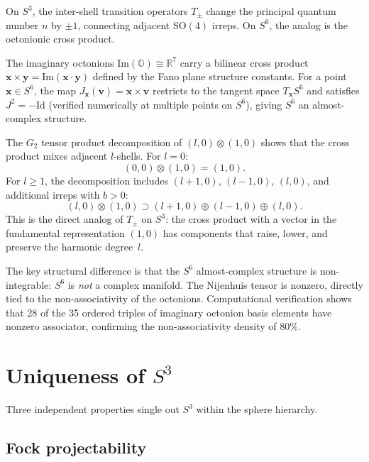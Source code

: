 \documentclass[twocolumn,pra,amsmath,amssymb,superscriptaddress]{revtex4-2}
\begin{document}
On $S^3$, the inter-shell transition operators $T_{\pm}$ change the
principal quantum number $n$ by $\pm 1$, connecting adjacent
$\mathrm{SO}(4)$ irreps.  On $S^6$, the analog is the octonionic
cross product.

The imaginary octonions $\mathrm{Im}(\mathbb{O}) \cong \mathbb{R}^7$
carry a bilinear cross product $\mathbf{x} \times \mathbf{y} =
\mathrm{Im}(\mathbf{x} \cdot \mathbf{y})$ defined by the Fano plane
structure constants.  For a point $\mathbf{x} \in S^6$, the map
$J_{\mathbf{x}}(\mathbf{v}) = \mathbf{x} \times \mathbf{v}$
restricts to the tangent space $T_{\mathbf{x}} S^6$ and satisfies
$J^2 = -\mathrm{Id}$ (verified numerically at multiple points on
$S^6$), giving $S^6$ an almost-complex structure.

The $G_2$ tensor product decomposition of $(l,0) \otimes (1,0)$
shows that the cross product mixes adjacent $l$-shells.  For
$l = 0$:
\begin{equation}
(0,0) \otimes (1,0) = (1,0).
\end{equation}
For $l \geq 1$, the decomposition includes $(l+1,0)$, $(l-1,0)$,
$(l,0)$, and additional irreps with $b > 0$:
\begin{equation}
(l,0) \otimes (1,0) \supset (l{+}1,0) \oplus (l{-}1,0) \oplus (l,0).
\end{equation}
This is the direct analog of $T_{\pm}$ on $S^3$: the cross product
with a vector in the fundamental representation $(1,0)$ has
components that raise, lower, and preserve the harmonic degree~$l$.

The key structural difference is that the $S^6$ almost-complex
structure is non-integrable: $S^6$ is \emph{not} a complex manifold.
The Nijenhuis tensor is nonzero, directly tied to the
non-associativity of the octonions.  Computational verification
shows that 28 of the 35 ordered triples of imaginary octonion
basis elements have nonzero associator, confirming the
non-associativity density of $80\%$.

\section{Uniqueness of $S^3$}
\label{sec:uniqueness}

Three independent properties single out $S^3$ within the sphere
hierarchy.

\subsection{Fock projectability}
\end{document}
